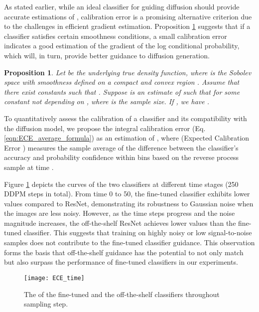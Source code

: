 \documentclass{article}
\newtheorem{proposition}[theorem]{Proposition}
\theoremstyle{definition}
\begin{document}
  
As stated earlier, while an ideal classifier for guiding diffusion should provide accurate estimations of , calibration error is a promising alternative criterion due to the challenges in efficient gradient estimation. 
Proposition \ref{prop} suggests that if a classifier satisfies certain smoothness conditions, a small calibration error indicates a good estimation of the gradient of the log conditional probability, which will, in turn, provide better guidance to diffusion generation. 

\begin{proposition}\label{prop}
    Let  be the underlying true density function, where  is the Sobolev space with smoothness  defined on a compact and convex region . Assume that there exist constants  such that . Suppose  is an estimate of  such that  for some constant  not depending on , where  is the sample size. If , we have .
\end{proposition}


To quantitatively assess the calibration of a classifier and its compatibility with the diffusion model, 
we propose the integral calibration error  (Eq.\ref{eqn:ECE_average_formula}) as an estimation of , where  (Expected Calibration Error \citep{naeini2015obtaining}) measures the sample average of the difference between the classifier's accuracy and probability confidence within bins  based on the reverse process sample  at time . 

Figure \ref{fig:ECE_time} depicts the  curves of the two classifiers at different time stages (250 DDPM steps in total). From time 0 to 50, the fine-tuned classifier exhibits lower  values compared to ResNet, demonstrating its robustness to Gaussian noise when the images are less noisy. However, as the time steps progress and the noise magnitude increases, the off-the-shelf ResNet achieves lower  values than the fine-tuned classifier. This suggests that training on highly noisy or low signal-to-noise samples does not contribute to the fine-tuned classifier guidance. This observation forms the basis that off-the-shelf guidance has the potential to not only match but also surpass the performance of fine-tuned classifiers in our experiments. 

\begin{figure}[h]
  \centering
\texttt{[image: ECE\_time]}
  \caption{The  of the fine-tuned and the off-the-shelf classifiers throughout sampling step.}
  \label{fig:ECE_time}
\end{figure}
\end{document}
